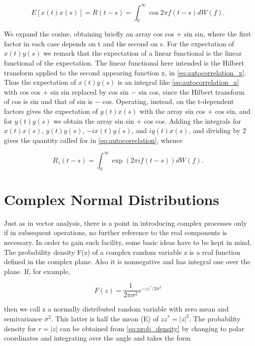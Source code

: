 \documentclass[10pt,twocolumn]{article}
\theoremstyle{definition}
\begin{document}
\begin{equation}
\label{eq:autocorrelation_x}
E[x(t)x(s)] = R(t - s) = \int_{0}^{\infty} \cos 2\pi f(t - s) dW(f).
\end{equation}

We expand the cosine, obtaining briefly an array cos cos + sin sin, where the first factor in each case depends on t and the second on s. For the expectation of $x(t)y(s)$ we remark that the expectation of a linear functional is the linear functional of the expectation. The linear functional here intended is the Hilbert transform applied to the second appearing function x, in \eqref{eq:autocorrelation_x}. Thus the expectation of $x(t)y(s)$ is an integral like \eqref{eq:autocorrelation_x} with cos cos + sin sin replaced by cos sin − sin cos, since the Hilbert transform of cos is sin and that of sin is − cos. Operating, instead, on the t-dependent factors gives the expectation of $y(t)x(s)$ with the array sin cos + cos sin, and for $y(t)y(s)$ we obtain the array sin sin + cos cos. Adding the integrals for $x(t)x(s)$, $y(t)y(s)$, $-ix(t)y(s)$, and $iy(t)x(s)$, and dividing by 2 gives the quantity called for in \eqref{eq:autocorrelation}, whence

\begin{equation}
\label{eq:rz_expression}
R_z(t - s) = \int_{0}^{\infty} \exp (2\pi if(t - s)) dW(f).
\end{equation}

\section{Complex Normal Distributions}

Just as in vector analysis, there is a point in introducing complex processes only if in subsequent operations, no further reference to the real components is necessary. In order to gain such facility, some basic ideas have to be kept in mind. The probability density F(z) of a complex random variable z is a real function defined in the complex plane. Also it is nonnegative and has integral one over the plane. If, for example,

\begin{equation}
\label{eq:prob_density}
F(z) = \frac{1}{2\pi\sigma^2} e^{-zz^*/2\sigma^2}
\end{equation}

then we call z a normally distributed random variable with zero mean and semivariance $\sigma^2$. This latter is half the mean (E) of $zz^* = |z|^2$. The probability density for $r = |z|$ can be obtained from \eqref{eq:prob_density} by changing to polar coordinates and integrating over the angle and takes the form
\end{document}
